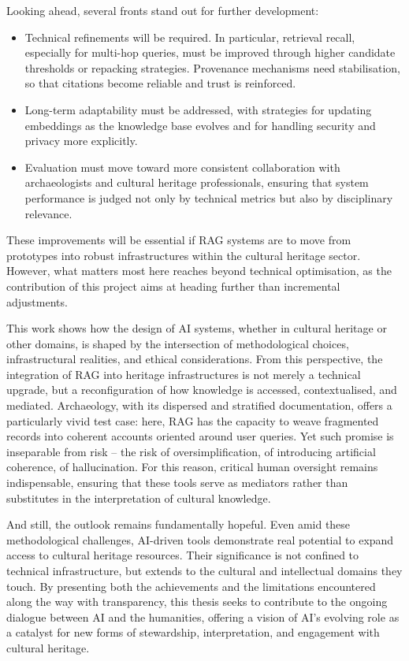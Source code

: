\begin{spacing}{1.5}
Looking ahead, several fronts stand out for further development:
\begin{itemize}
    \item Technical refinements will be required. In particular, retrieval recall, especially for multi-hop queries, must be improved through higher candidate thresholds or repacking strategies. Provenance mechanisms need stabilisation, so that citations become reliable and trust is reinforced. 
    \item Long-term adaptability must be addressed, with strategies for updating embeddings as the knowledge base evolves and for handling security and privacy more explicitly.
    \item Evaluation must move toward more consistent collaboration with archaeologists and cultural heritage professionals, ensuring that system performance is judged not only by technical metrics but also by disciplinary relevance.
\end{itemize}

These improvements will be essential if RAG systems are to move from prototypes into robust infrastructures within the cultural heritage sector. However, what matters most here reaches beyond technical optimisation, as the contribution of this project aims at heading further than incremental adjustments. 

This work shows how the design of AI systems, whether in cultural heritage or other domains, is shaped by the intersection of methodological choices, infrastructural realities, and ethical considerations. From this perspective, the integration of RAG into heritage infrastructures is not merely a technical upgrade, but a reconfiguration of how knowledge is accessed, contextualised, and mediated. Archaeology, with its dispersed and stratified documentation, offers a particularly vivid test case: here, RAG has the capacity to weave fragmented records into coherent accounts oriented around user queries. Yet such promise is inseparable from risk -- the risk of oversimplification, of introducing artificial coherence, of hallucination. For this reason, critical human oversight remains indispensable, ensuring that these tools serve as mediators rather than substitutes in the interpretation of cultural knowledge. 

And still, the outlook remains fundamentally hopeful. Even amid these methodological challenges, AI-driven tools demonstrate real potential to expand access to cultural heritage resources. Their significance is not confined to technical infrastructure, but extends to the cultural and intellectual domains they touch. By presenting both the achievements and the limitations encountered along the way with transparency, this thesis seeks to contribute to the ongoing dialogue between AI and the humanities, offering a vision of AI’s evolving role as a catalyst for new forms of stewardship, interpretation, and engagement with cultural heritage.


\end{spacing}
